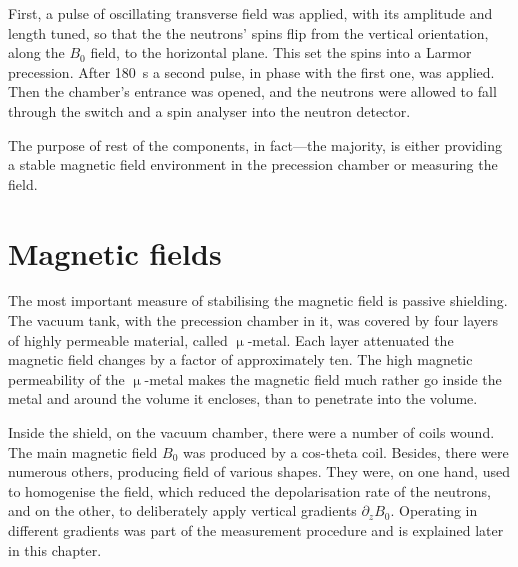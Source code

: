 First, a pulse of oscillating transverse field was applied, with its amplitude and length tuned, so that the the neutrons' spins flip from the vertical orientation, along the $B_0$ field, to the horizontal plane. This set the spins into a Larmor precession.
After \SI{180}{\second} a second pulse, in phase with the first one, was applied. Then the chamber's entrance was opened, and the neutrons were allowed to fall through the switch and a spin analyser into the neutron detector.


The purpose of rest of the components, in fact---the majority, is either providing a stable magnetic field environment in the precession chamber or measuring the field.




\section{Magnetic fields}
The most important measure of stabilising the magnetic field is passive shielding. The vacuum tank, with the precession chamber in it, was covered by four layers of highly permeable material, called $\upmu$-metal.
Each layer attenuated the magnetic field changes by a factor of approximately ten. The high magnetic permeability of the $\upmu$-metal makes the magnetic field much rather go inside the metal and around the volume it encloses, than to penetrate into the volume. 

Inside the shield, on the vacuum chamber, there were a number of coils wound. The main magnetic field $B_0$ was produced by a cos-theta coil.
Besides, there were numerous others, producing field of various shapes.
They were, on one hand, used to homogenise the field, which reduced the depolarisation rate of the neutrons,
and on the other, to deliberately apply vertical gradients $\partial_z B_0$. Operating in different gradients was part of the measurement procedure and is explained later in this chapter.

